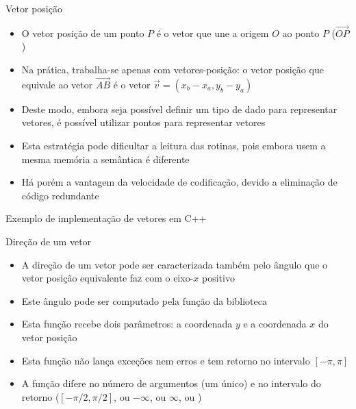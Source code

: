 \begin{frame}[fragile]{Vetor posição}

    \begin{itemize}
        \item O vetor posição de um ponto $P$ é o vetor que une a origem $O$ ao ponto $P$ 
            ($\overrightarrow{OP}$)
        \pause

        \item Na prática, trabalha-se apenas com vetores-posição: o vetor posição que equivale ao
            vetor $\overrightarrow{AB}$ é o vetor $\vec{v} = (x_b - x_a, y_b - y_a)$
        \pause

        \item Deste modo, embora seja possível definir um tipo de dado para representar vetores, é possível utilizar pontos para representar vetores
        \pause

        \item Esta estratégia pode dificultar a leitura das rotinas, pois embora usem a mesma memória a semântica é diferente 
        \pause

        \item Há porém a vantagem da velocidade de codificação, devido a eliminação de código redundante
    \end{itemize}

\end{frame}

\begin{frame}[fragile]{Exemplo de implementação de vetores em C++}
\end{frame}

\begin{frame}[fragile]{Direção de um vetor}

    \begin{itemize}
        \item A direção de um vetor pode ser caracterizada também pelo ângulo que o vetor posição
            equivalente faz com o eixo-$x$ positivo
        \pause

        \item Este ângulo pode ser computado pela função  da biblioteca 
        \pause

        \item Esta função recebe dois parâmetros: a coordenada $y$ e a coordenada $x$ do
            vetor posição
        \pause

        \item Esta função não lança exceções nem erros e tem retorno no intervalo $[-\pi, \pi]$
        \pause

        \item A função  difere no número de argumentos (um único) e no intervalo do 
            retorno ($[-\pi/2, \pi/2]$, ou $-\infty$, ou $\infty$, ou )
    \end{itemize}

\end{frame}

